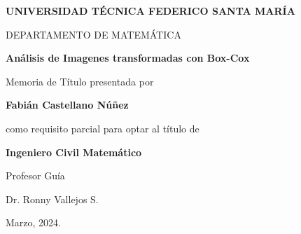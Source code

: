 \thispagestyle{empty}

\begin{center}
\large \textbf{UNIVERSIDAD T\'ECNICA FEDERICO SANTA MAR\'IA}

\vspace{3mm}

\normalsize DEPARTAMENTO DE MATEM\'ATICA
\vspace{35mm}

\Large {\bf An\'alisis de Imagenes transformadas con Box-Cox}

\vspace{35mm}

\normalsize Memoria de T\'itulo presentada por

\vspace{2mm}

\large{\textbf{Fabi\'an Castellano N\'u\~nez}}

\vspace{10mm}

\normalsize como requisito parcial para optar al t\'itulo de

\vspace{2mm}

\textbf{Ingeniero Civil Matem\'atico}

\vspace{15mm}

Profesor Gu\'ia

\vspace{2mm}

Dr. Ronny Vallejos S.

\vspace{5mm}

Marzo, 2024.

\end{center}